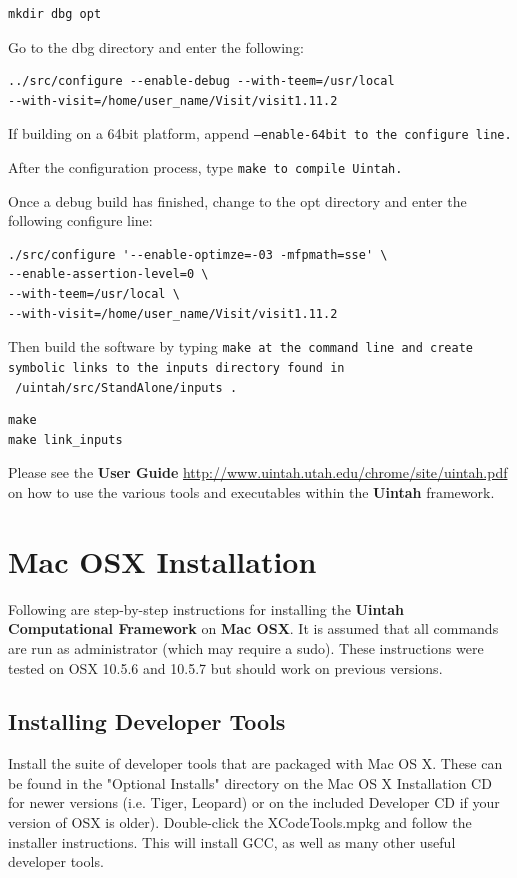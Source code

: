 \documentclass[12pt]{article}
\begin{document}
\begin{verbatim}
mkdir dbg opt
\end{verbatim}

Go to the dbg directory and enter the following:

\begin{verbatim}
../src/configure --enable-debug --with-teem=/usr/local
--with-visit=/home/user_name/Visit/visit1.11.2
\end{verbatim}

If building on a 64bit platform, append \tt --enable-64bit \normalfont
to the configure line.

After the configuration process, type \tt make \normalfont to compile
Uintah.

Once a debug build has finished, change to the opt directory and enter
the following configure line:

\begin{verbatim}
./src/configure '--enable-optimze=-03 -mfpmath=sse' \
--enable-assertion-level=0 \
--with-teem=/usr/local \
--with-visit=/home/user_name/Visit/visit1.11.2
\end{verbatim}

Then build the software by typing \tt make \normalfont at the command line and create symbolic links to the inputs directory found in \tt ~/uintah/src/StandAlone/inputs \normalfont.
\begin{verbatim}
make
make link_inputs
\end{verbatim}

Please see the \textbf{User Guide}
\url{http://www.uintah.utah.edu/chrome/site/uintah.pdf} on how to use
the various tools and executables within the \textbf{Uintah}
framework.

\section{Mac OSX Installation}

Following are step-by-step instructions for installing the \textbf{Uintah Computational Framework} on \textbf{Mac OSX}.  It is assumed that all commands are run as administrator (which may require a sudo).  These instructions were tested on OSX 10.5.6 and 10.5.7 but should work on previous versions.

\subsection{Installing Developer Tools}
Install the suite of developer tools that are packaged with Mac OS X.  These can be found in the "Optional Installs" directory on the Mac OS X Installation CD for newer versions (i.e. Tiger, Leopard) or on the included Developer CD if your version of OSX is older).  Double-click the XCodeTools.mpkg and follow the installer instructions.  This will install GCC, as well as many other useful developer tools.
\end{document}
